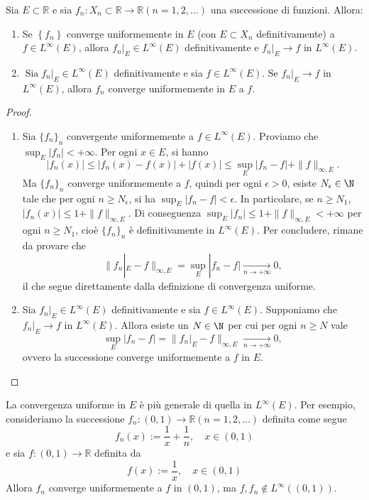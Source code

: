 \begin{proposition}[$*$]\label{prop: 4.2}
    Sia $E \subset \mathbb{R}$ e sia $f_{n}: X_{n} \subset \mathbb{R} \rightarrow \mathbb{R}(n=1,2, \ldots)$ una successione di funzioni. Allora:
    \begin{enumerate}
        \item Se $\left\{f_{n}\right\}$ converge uniformemente in $E$ (con $E\subset X_n$ definitivamente) a $f \in L^{\infty}(E)$, allora $\left.f_{n}\right|_{E} \in L^{\infty}(E)$ definitivamente e $\left.f_{n}\right|_{E} \rightarrow f$ in $L^{\infty}(E)$.
        \item $\left.\operatorname{Sia} f_{n}\right|_{E} \in L^{\infty}(E)$ definitivamente e sia $f \in L^{\infty}(E)$. Se $\left.f_{n}\right|_{E} \rightarrow f$ in $L^{\infty}(E)$, allora $f_{n}$ converge uniformemente in $E$ a $f$.
    \end{enumerate}
\end{proposition}
\begin{proof}
    \begin{enumerate}
        \item Sia $\{f_n\}_n$ convergente uniformemente a $f\in L^{\infty}(E)$. Proviamo che $\sup_E|f_n|<+\infty$. Per ogni $x\in E$, si hanno
        \[|f_n(x)|\leq |f_n(x)-f(x)|+|f(x)|\leq \sup_E|f_n-f|+\|f\|_{\infty,E}.\]
        Ma $\{f_n\}_n$ converge uniformemente a $f$, quindi per ogni $\epsilon >0$, esiste $N_\epsilon \in \N$ tale che per ogni $n\geq N_\epsilon$, si ha $\sup_E|f_n-f|<\epsilon$. In particolare, se $n\geq N_1$, $|f_n(x)|\leq 1+\|f\|_{\infty,E}$. Di conseguenza $\sup_E|f_n|\leq 1+\|f\|_{\infty,E}<+\infty$ per ogni $n\geq N_1$, cioè $\{f_n\}_n$ è definitivamente in $L^{\infty}(E)$. Per concludere, rimane da provare che 
        \[\bigl\|f_n|_E-f\bigr\|_{\infty, E} = \sup_E|f_n-f|\xrightarrow[n\to +\infty]{}0,\]
        il che segue direttamente dalla definizione di convergenza uniforme.
        \item Sia $f_n|_E\in L^{\infty}(E)$ definitivamente e sia $f\in L^{\infty}(E)$. Supponiamo che $f_n|_E\to f$ in $L^{\infty}(E)$. Allora esiste un $N\in \N$ per cui per ogni $n\geq N$ vale
        \[ \sup_E|f_n-f| = \bigl\|f_n|_E-f\bigr\|_{\infty, E}\xrightarrow[n\to +\infty]{}0,\]
        ovvero la successione converge uniformemente a $f$ in $E$.
    \end{enumerate}
\end{proof}

\begin{oss}
    La convergenza uniforme in $E$ è più generale di quella in $L^{\infty}(E)$. Per esempio, consideriamo la successione $f_{n}:(0,1) \rightarrow \mathbb{R}(n=1,2, \ldots)$ definita come segue
    \[f_{n}(x):=\frac{1}{x}+\frac{1}{n}, \quad x \in(0,1)\]
    e sia $f:(0,1) \rightarrow \mathbb{R}$ definita da
    \[f(x):=\frac{1}{x}, \quad x \in(0,1)\]
    Allora $f_{n}$ converge uniformemente a $f$ in $(0,1)$, ma $f, f_{n} \notin L^{\infty}((0,1))$.    
\end{oss}

